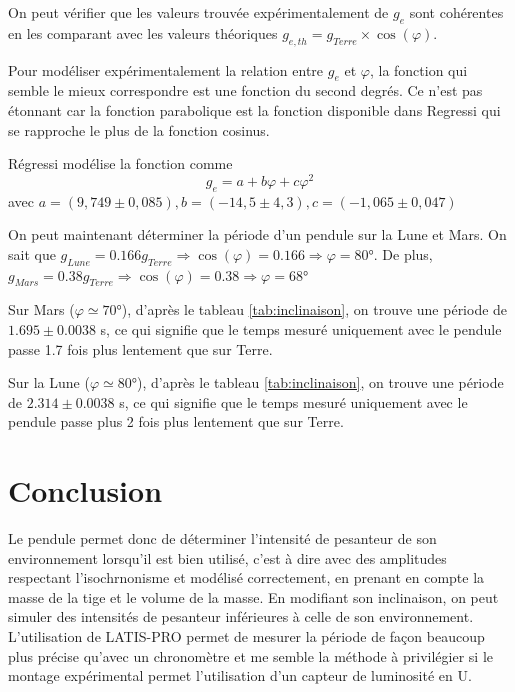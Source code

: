 \documentclass[a4paper,10pt,french]{scrartcl}
\begin{document}
On peut vérifier que les valeurs trouvée expérimentalement de  \(g_e\) sont cohérentes en les comparant avec les valeurs théoriques \(g_{e,th} = g_{Terre}\times \cos(\varphi)\).

Pour modéliser expérimentalement la relation entre \(g_e\) et \(\varphi\), la fonction qui semble le mieux correspondre est une fonction du second degrés. Ce n'est pas étonnant car la fonction parabolique est la fonction disponible dans Regressi qui se rapproche le plus de la fonction cosinus.

Régressi modélise la fonction comme \[g_e = a+b\varphi+c\varphi^2\]
avec \(a =( 9,749 \pm 0,085), b = (-14,5 \pm 4,3), c = (-1,065 \pm 0,047)\)

On peut maintenant déterminer la période d'un pendule sur la Lune et Mars. On sait que \(g_{Lune} = 0.166g_{Terre} \Rightarrow \cos(\varphi) = 0.166 \Rightarrow \varphi = 80°\). De plus, \(g_{Mars} = 0.38g_{Terre} \Rightarrow \cos(\varphi) = 0.38 \Rightarrow \varphi = 68°\)

Sur Mars (\(\varphi \simeq 70\)°), d'après le tableau \ref{tab:inclinaison}, on trouve une période de \(1.695 \pm 0.0038\) s, ce qui signifie que le temps mesuré uniquement avec le pendule passe 1.7 fois plus lentement que sur Terre.

Sur la Lune (\(\varphi \simeq 80\)°), d'après le tableau \ref{tab:inclinaison}, on trouve une période de \(2.314 \pm 0.0038\) s, ce qui signifie que le temps mesuré uniquement avec le pendule passe plus 2 fois plus lentement que sur Terre.

\section{Conclusion}
Le pendule permet donc de déterminer l'intensité de pesanteur de son environnement lorsqu'il est bien utilisé, c'est à dire avec des amplitudes respectant l'isochrnonisme et modélisé correctement, en prenant en compte la masse de la tige et le volume de la masse. En modifiant son inclinaison, on peut simuler des intensités de pesanteur inférieures à celle de son environnement. L'utilisation de LATIS-PRO permet de mesurer la période de façon beaucoup plus précise qu'avec un chronomètre et me semble la méthode à privilégier si le montage expérimental permet l'utilisation d'un capteur de luminosité en U.
\end{document}
